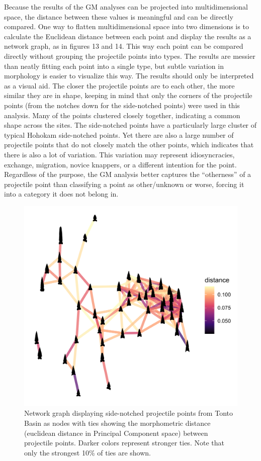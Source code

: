 \documentclass[a4paper]{article}
\begin{document}
Because the results of the GM analyses can be projected into multidimensional space, the distance between these values is meaningful and can be directly compared. One way to flatten multidimensional space into two dimensions is to calculate the Euclidean distance between each point and display the results as a network graph, as in figures 13 and 14. This way each point can be compared directly without grouping the projectile points into types. The results are messier than neatly fitting each point into a single type, but subtle variation in morphology is easier to visualize this way. The results should only be interpreted as a visual aid. The closer the projectile points are to each other, the more similar they are in shape, keeping in mind that only the corners of the projectile points (from the notches down for the side-notched points) were used in this analysis. Many of the points clustered closely together, indicating a common shape across the sites. The side-notched points have a particularly large cluster of typical Hohokam side-notched points. Yet there are also a large number of projectile points that do not closely match the other points, which indicates that there is also a lot of variation. This variation may represent idiosyncracies, exchange, migration, novice knappers, or a different intention for the point. Regardless of the purpose, the GM analysis better captures the ``otherness'' of a projectile point than classifying a point as other/unknown or worse, forcing it into a category it does not belong in.

\begin{figure}
\includegraphics[width=1\linewidth]{figures/TontoSideDistanceNetwork} \caption{Network graph displaying side-notched projectile points from Tonto Basin as nodes with ties showing the morphometric distance (euclidean distance in Principal Component space) between projectile points. Darker colors represent stronger ties. Note that only the strongest 10\% of ties are shown.}\label{fig:TontoSideDistanceNetwork}
\end{figure}
\end{document}
